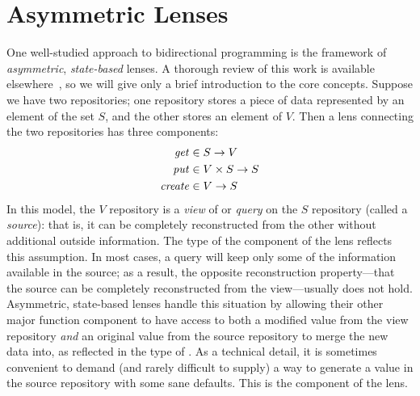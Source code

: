 \section{Asymmetric Lenses}
\label{sec:asymmetric-lenses}
One well-studied approach to bidirectional programming is the framework of
\emph{asymmetric}, \emph{state-based} lenses. A thorough review of this work
is available elsewhere~\cite{FosterThesis}, so we will give only a brief
introduction to the core concepts. Suppose we have two repositories; one
repository stores a piece of data represented by an element of the set $S$,
and the other stores an element of $V$. Then a lens connecting the two
repositories has three components:
\begin{align*}
    \mathit{get} &\in S \to V \\
    \mathit{put} &\in V \times S \to S \\
    \mathit{create} &\in V \to S
\end{align*}
In this model, the $V$ repository is a \emph{view} of or \emph{query} on the
$S$ repository (called a \emph{source}): that is, it can be completely
reconstructed from the other without additional outside information. The
type of the \GET component of the lens reflects this assumption. In most
cases, a query will keep only some of the information available in the
source; as a result, the opposite reconstruction property---that the source
can be completely reconstructed from the view---usually does not hold.
Asymmetric, state-based lenses handle this situation by allowing their other
major function component to have access to both a modified value from the
view repository \emph{and} an original value from the source repository to
merge the new data into, as reflected in the type of \PUT. As a technical
detail, it is sometimes convenient to demand (and rarely difficult to
supply) a way to generate a value in the source repository with some sane
defaults. This is the \CREATE component of the lens.

